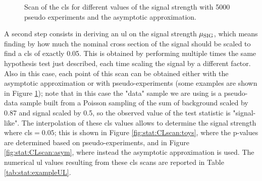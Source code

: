\begin{figure}[h]
\centering 
{}
\caption{
Scan of the \gls{cls} for different values of the signal strength with  5000 pseudo experiments and  the asymptotic approximation.
}
\label{fig:stat:CLscan}
\end{figure}

A second step consists in deriving an \gls{ul} on the signal strength $\mu_{\rm SIG}$, which means finding by how much the 
nominal cross section of the signal should be scaled to find a \gls{cls} of exactly 0.05. This is obtained by performing multiple times the same hypothesis test just described, each time scaling the signal by a different factor. 
Also in this case, each point of this scan can be obtained either with the asymptotic approximation or with pseudo-experiments (some examples are shown in Figure \ref{fig:stat:CLscan}); note that in this case the "data" sample we are using is a pseudo-data sample built from a Poisson sampling 
of the sum of background scaled by 0.87 and signal scaled by 0.5, so the observed value of the test statistic is "signal-like".
The interpolation of these \gls{cls} values  allows to determine the signal strength where \gls{cls}$=0.05$; 
this is shown in Figure \ref{fig:stat:CLscan:toys}, where the p-values are determined based on pseudo-experiments, 
and in Figure \ref{fig:stat:CLscan:asym}, where instead the asymptotic approximation is used.
The numerical \gls{ul} values resulting from these \gls{cls} scans are reported in Table \ref{tab:stat:exampleUL}.


